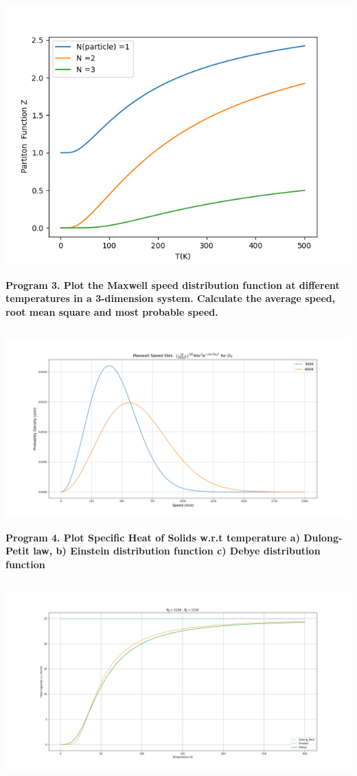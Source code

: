 \documentclass{article}
\begin{document}
	\includegraphics[width=15 cm]{FD_5.png}

	\textbf{Program 3. Plot the Maxwell speed distribution function at different temperatures in a 3-dimension
		system. Calculate the average speed, root mean square and most probable speed.}\\
	\inputminted{python}{prac_4.py}
	\includegraphics[width=15 cm]{prac_4_oxygen.png}

	\textbf{Program 4. Plot Specific Heat of Solids w.r.t temperature
		a) Dulong-Petit law,
		b) Einstein distribution function
		c) Debye distribution function}\\
	\inputminted{python}{prac_5.py}
	\includegraphics[width=15 cm]{prac_5.png}
	
\end{document}
